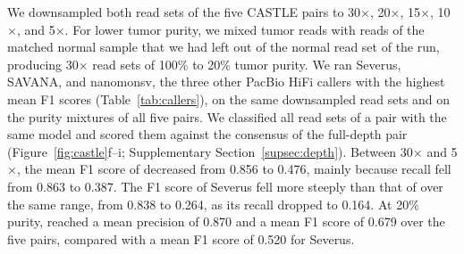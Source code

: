 \begin{table}[tbp]
\centering
\caption{PacBio HiFi callers on COLO829 and HG008}
\label{tab:external}
\small
{}
\end{table}

We downsampled both read sets of the five CASTLE pairs to 30$\times$, 20$\times$, 15$\times$, 10$\times$, and 5$\times$.
For lower tumor purity, we mixed tumor reads with reads of the matched normal sample that we had left out of the normal read set of the run, producing 30$\times$ read sets of 100\% to 20\% tumor purity.
We ran Severus, SAVANA, and nanomonsv, the three other PacBio HiFi callers with the highest mean F1 scores (Table~\ref{tab:callers}), on the same downsampled read sets and on the purity mixtures of all five pairs.
We classified all read sets of a pair with the same model and scored them against the consensus of the full-depth pair (Figure~\ref{fig:castle}f--i; Supplementary Section~\ref{supsec:depth}).
Between 30$\times$ and 5$\times$, the mean F1 score of \tool{} decreased from 0.856 to 0.476, mainly because recall fell from 0.863 to 0.387.
The F1 score of Severus fell more steeply than that of \tool{} over the same range, from 0.838 to 0.264, as its recall dropped to 0.164.
At 20\% purity, \tool{} reached a mean precision of 0.870 and a mean F1 score of 0.679 over the five pairs, compared with a mean F1 score of 0.520 for Severus.

